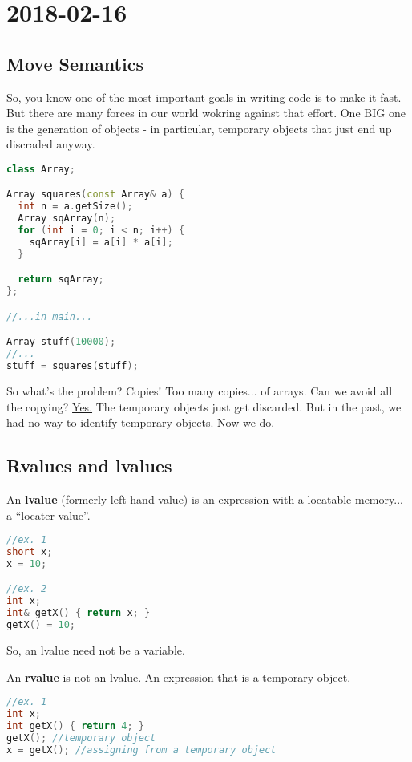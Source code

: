 \section{2018-02-16}

\subsection{Move Semantics}

So, you know one of the most important goals in writing code is to make it fast. But there are many forces in our world wokring against that effort. One BIG one is the generation of objects - in particular, temporary objects that just end up discraded anyway.

\begin{lstlisting}[language=C++]
class Array;

Array squares(const Array& a) {
  int n = a.getSize();
  Array sqArray(n);
  for (int i = 0; i < n; i++) {
    sqArray[i] = a[i] * a[i];
  }

  return sqArray;
};

//...in main...

Array stuff(10000);
//...
stuff = squares(stuff);
\end{lstlisting}

So what's the problem? Copies! Too many copies... of arrays. Can we avoid all the copying? \underline{Yes.} The temporary objects just get discarded. But in the past, we had no way to identify temporary objects. Now we do.

\subsection{Rvalues and lvalues}

An \textbf{lvalue} (formerly left-hand value) is an expression with a locatable memory... a ``locater value''.

\begin{lstlisting}[language=C++]
//ex. 1
short x; 
x = 10;

//ex. 2
int x;
int& getX() { return x; }
getX() = 10;
\end{lstlisting}

So, an lvalue need not be a variable.

An \textbf{rvalue} is \underline{not} an lvalue. An expression that is a temporary object.

\begin{lstlisting}[language=C++]
//ex. 1
int x;
int getX() { return 4; }
getX(); //temporary object
x = getX(); //assigning from a temporary object
\end{lstlisting}

